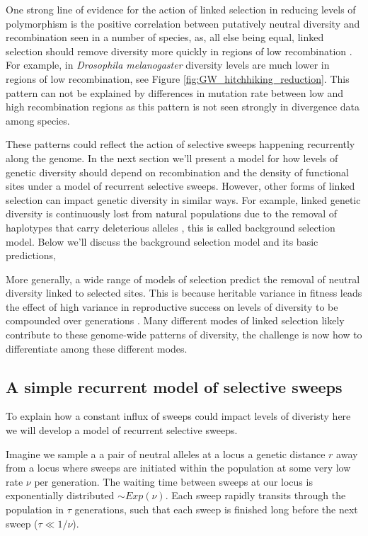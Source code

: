 One strong line of evidence for the action of linked selection in reducing levels of
polymorphism is the positive correlation between putatively
neutral diversity and recombination seen in a number of species, as, all
else being equal, linked selection should remove diversity more quickly in regions of low recombination 
\citep{Aguade:89,Begun:92,Wiehe:93,Cutter:10,Hellmann:08,Cai:09,
  cutter2013}. For example, in {\it Drosophila melanogaster} diversity
levels are much lower in regions of low recombination, see
Figure \ref{fig:GW_hitchhiking_reduction}. This pattern can not be
explained by differences in mutation rate between low and high
recombination regions as this pattern is not seen strongly in
divergence data among species.

These patterns could reflect the action of selective sweeps happening
recurrently along the genome. In the next section we'll present a model for how levels of
genetic diversity should depend on recombination and the density of
functional sites under a model of recurrent selective sweeps.
However, other forms of linked selection can impact genetic
diversity in similar ways. For example, linked genetic diversity is
continuously lost from natural populations due to the removal of
haplotypes that carry deleterious alleles
\citep{Charlesworth:95,Hudson:95}, this is called background selection
model. Below we'll discuss the background selection model and its
basic predictions, 

More generally, a wide range of models of selection predict the removal of neutral
diversity linked to selected sites. This is because heritable variance in fitness
leads the effect of high variance in reproductive success on
levels of diversity to be compounded over generations
\citep{Robertson:61,Santiago:95,Santiago:98,Barton:00,Gillespie_nonneutral,Gillespie:97,Neher:13,Good:14}. Many
different modes of linked selection likely contribute to these
genome-wide patterns of diversity, the challenge is now how to
differentiate among these different modes.


\subsection{A simple recurrent model of selective sweeps}
To explain how a constant influx of sweeps could impact levels of
diveristy here we will develop a model of recurrent
selective sweeps.

Imagine we sample a a pair of neutral alleles at a locus a genetic distance $r$ away from a locus where
sweeps are initiated within the population at some very low rate $\nu$
per generation. The waiting time between sweeps
at our locus is exponentially distributed $\sim Exp(\nu)$. Each sweep rapidly transits through the population in $\tau$
generations, such that each sweep is finished long before the next
sweep ($\tau \ll 1/\nu$). \\

